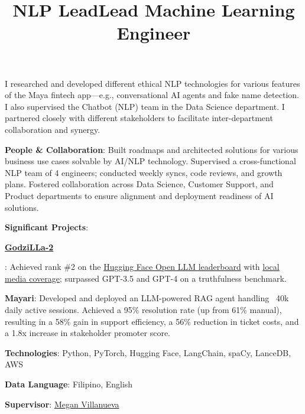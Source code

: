 \documentclass[margin]{res}
\newcommand{\SubItem}[1]{
    {\setlength\itemindent{15pt} \item[-] #1}
}
\begin{document}
\begin{resume}
\title{\textbf{NLP Lead}}
\begin{position}
I researched and developed different ethical NLP technologies for various features of the Maya fintech app---e.g., conversational AI agents and fake name detection. I also supervised the Chatbot (NLP) team in the Data Science department. I partnered closely with different stakeholders to facilitate inter-department collaboration and synergy.\\
\vspace{-3mm}
\begin{itemize}
    \item \textbf{People \& Collaboration}: Built roadmaps and architected solutions for various business use cases solvable by AI/NLP technology. Supervised a cross-functional NLP team of 4 engineers; conducted weekly syncs, code reviews, and growth plans. Fostered collaboration across Data Science, Customer Support, and Product departments to ensure alignment and deployment readiness of AI solutions.
    \item \textbf{Significant Projects}:
    \SubItem{\href{https://huggingface.co/MayaPH/GodziLLa2-70B}{\textbf{GodziLLa-2}}}: Achieved rank \#2 on the \href{https://huggingface.co/spaces/HuggingFaceH4/open_llm_leaderboard}{Hugging Face Open LLM leaderboard} with \href{https://www.rappler.com/technology/maya-philippines-open-source-llm-godzilla-2-surpasses-chatgpt-truthfulness/}{local media coverage}; surpassed GPT-3.5 and GPT-4 on a truthfulness benchmark.
    \SubItem{\textbf{Mayari}: Developed and deployed an LLM-powered RAG agent handling ~40k daily active sessions. Achieved a 95\% resolution rate (up from 61\% manual), resulting in a 58\% gain in support efficiency, a 56\% reduction in ticket costs, and a 1.8x increase in stakeholder promoter score.}
    \item \textbf{Technologies}: Python, PyTorch, Hugging Face, LangChain, spaCy, LanceDB, AWS
    \item \textbf{Data Language}: Filipino, English
    \item \textbf{Supervisor}: \href{https://www.linkedin.com/in/megvillanueva}{Megan Villanueva}
\end{itemize}
\end{position}
\title{\textbf{Lead Machine Learning Engineer}}

\end{resume}
\end{document}
